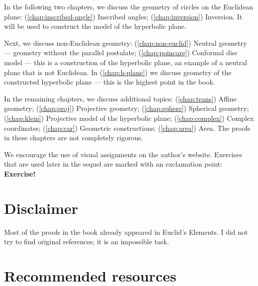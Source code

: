 In the following two chapters, we discuss the geometry of circles on the Euclidean plane:
(\ref{chap:inscribed-angle}) Inscribed angles; (\ref{chap:inversion}) Inversion.
It  will be used to construct the model of the hyperbolic plane.

Next, we discuss non-Euclidean geometry:
(\ref{chap:non-euclid})
Neutral geometry --- geometry without the parallel postulate;
(\ref{chap:poincare})
Conformal disc model ---
this is a construction of the hyperbolic plane,
an example of a neutral plane that is not Euclidean.
In (\ref{chap:h-plane}) we discuss geometry of the constructed hyperbolic plane --- this is the highest point in the book.

In the remaining chapters, we discuss additional topics:
(\ref{chap:trans}) Affine geometry;
(\ref{chap:proj}) Projective geometry;
(\ref{chap:sphere}) Spherical geometry;
(\ref{chap:klein}) Projective model of the hyperbolic plane;
(\ref{chap:complex}) Complex coordinates;
(\ref{chap:car}) Geometric constructions;
(\ref{chap:area}) Area.
The proofs in these chapters are not completely rigorous.

We encourage the use of visual assignments on the author's website.
Exercises that are used later in the sequel are marked with an exclamation point: \textbf{Exercise!}

\section{Disclaimer}
 
Most of the proofs in the book already appeared in Euclid's Elements.
I did not try to find original references; it is an impossible task.

\section{Recommended resources}

